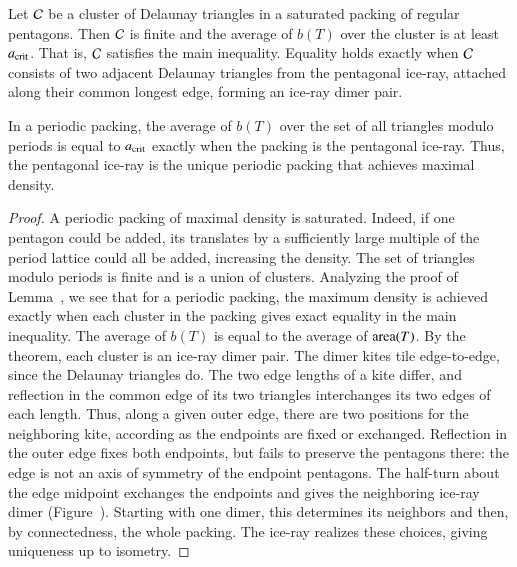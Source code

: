 \begin{theorem}
  Let $\mathcal C$ be a cluster of Delaunay triangles in a saturated packing
  of regular pentagons.  Then $\mathcal C$ is finite and the average of $b(T)$
  over the cluster is at least $a_\text{crit}$.  That is, $\mathcal C$ satisfies the
  main inequality.  Equality holds exactly when $\mathcal C$ consists of two
  adjacent Delaunay triangles from the pentagonal ice-ray, attached
  along their common longest edge, forming an ice-ray dimer pair.
\end{theorem}

\begin{corollary}\label{cor:equal}
  In a periodic packing, the average of $b(T)$ over the set of
  all triangles modulo periods is equal to $a_\text{crit}$ exactly when
  the packing is the pentagonal ice-ray.
  Thus, the pentagonal ice-ray  is the
unique periodic packing that achieves maximal density.
\end{corollary}

\begin{proof}
  A periodic packing of maximal density is saturated. Indeed, if one
  pentagon could be added, its translates by a sufficiently large
  multiple of the period lattice could all be added, increasing the
  density. The set of triangles modulo periods is finite and is a union
  of clusters.  Analyzing the proof of Lemma~, we see
  that for a periodic packing, the maximum density is achieved exactly
  when each cluster in the packing gives exact equality in the main
  inequality.  The average of $b(T)$ is equal to the average of
  ${\operatorname{area}}(T)$.  By the theorem, each cluster is an ice-ray dimer pair.
  The dimer kites tile edge-to-edge, since the Delaunay triangles do.
  The two edge lengths of a kite differ, and reflection in the common
  edge of its two triangles interchanges its two edges of each length.
  Thus, along a given outer edge, there are two positions for the
  neighboring kite, according as the endpoints are fixed or exchanged.
  Reflection in the outer edge fixes both endpoints, but fails to
  preserve the pentagons there: the edge is not an axis of symmetry
  of the endpoint pentagons. The half-turn about the edge midpoint
  exchanges the endpoints and gives the neighboring ice-ray dimer
  (Figure~).
  Starting with one dimer, this determines its neighbors and then,
  by connectedness, the whole packing. The ice-ray realizes these
  choices, giving uniqueness up to isometry.
\end{proof}

